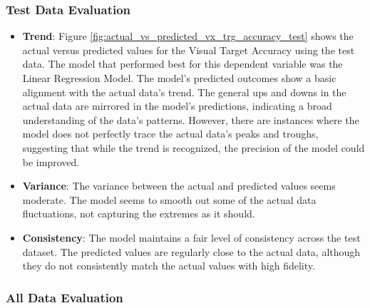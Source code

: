 \subsubsection*{Test Data Evaluation}

\begin{itemize}
    \item \textbf{Trend}: Figure \ref{fig:actual_vs_predicted_vx_trg_accuracy_test} shows the actual versus predicted values for the Visual Target Accuracy using the test data. The model that performed
    best for this dependent variable was the Linear Regression Model. The model's predicted outcomes show a basic alignment with the actual data's trend. The general ups and downs in the actual data are
    mirrored in the model's predictions, indicating a broad understanding of the data's patterns. However, there are instances where the model does not perfectly trace the actual data's peaks and troughs, 
    suggesting that while the trend is recognized, the precision of the model could be improved.

    \item \textbf{Variance}: The variance between the actual and predicted values seems moderate. The model seems to smooth out some of the actual data fluctuations, not capturing the extremes as it should.
        
    \item \textbf{Consistency}: The model maintains a fair level of consistency across the test dataset. The predicted values are regularly close to the actual data, although they do not consistently match the
    actual values with high fidelity. 
    
\end{itemize}

\subsubsection*{All Data Evaluation}

